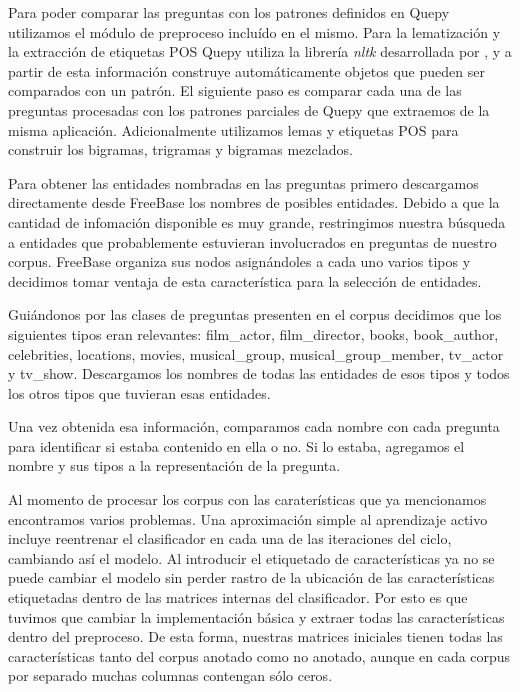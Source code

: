 Para poder comparar las preguntas con los patrones definidos en Quepy utilizamos el módulo de preproceso incluído en el mismo. Para la lematización y la extracción de etiquetas POS Quepy utiliza la librería \textit{nltk} desarrollada por \citet{nltk}, y a partir de esta información construye automáticamente objetos que pueden ser comparados con un patrón. El siguiente paso es comparar cada una de las preguntas procesadas con los patrones parciales de Quepy que extraemos de la misma aplicación. Adicionalmente utilizamos lemas y etiquetas POS para construir los bigramas, trigramas y bigramas mezclados.

Para obtener las entidades nombradas en las preguntas primero descargamos directamente desde FreeBase los nombres de posibles entidades. Debido a que la cantidad de infomación disponible es muy grande, restringimos nuestra búsqueda a entidades que probablemente estuvieran involucrados en preguntas de nuestro corpus. FreeBase organiza sus nodos asignándoles a cada uno varios tipos y decidimos tomar ventaja de esta característica para la selección de entidades.

Guiándonos por las clases de preguntas presenten en el corpus decidimos que los siguientes tipos eran relevantes: film\_actor, film\_director, books, book\_author, celebrities, locations, movies, musical\_group, musical\_group\_member, tv\_actor y tv\_show. Descargamos los nombres de todas las entidades de esos tipos y todos los otros tipos que tuvieran esas entidades.

Una vez obtenida esa información, comparamos cada nombre con cada pregunta para identificar si estaba contenido en ella o no. Si lo estaba, agregamos el nombre y sus tipos a la representación de la pregunta.

Al momento de procesar los corpus con las caraterísticas que ya mencionamos encontramos varios problemas. Una aproximación simple al aprendizaje activo incluye reentrenar el clasificador en cada una de las iteraciones del ciclo, cambiando así el modelo. Al introducir el etiquetado de características ya no se puede cambiar el modelo sin perder rastro de la ubicación de las características etiquetadas dentro de las matrices internas del clasificador. Por esto es que tuvimos que cambiar la implementación básica y extraer todas las características dentro del preproceso. De esta forma, nuestras matrices iniciales tienen todas las características tanto del corpus anotado como no anotado, aunque en cada corpus por separado muchas columnas contengan sólo ceros.



